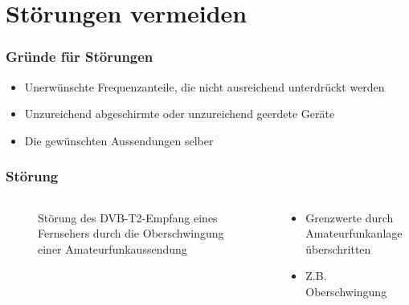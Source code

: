 
\section{Störungen vermeiden}
\label{section:stoerungen_vermeiden}
\begin{frame}%

\frametitle{Gründe für Störungen}
\begin{itemize}
  \item Unerwünschte Frequenzanteile, die nicht ausreichend unterdrückt werden
  \item Unzureichend abgeschirmte oder unzureichend geerdete Geräte 
  \item Die gewünschten Aussendungen selber
  \end{itemize}
\end{frame}

\begin{frame}
\frametitle{Störung}
\begin{columns}
    \begin{column}{0.48\textwidth}
    
\begin{figure}
    \caption{\scriptsize Störung des DVB-T2-Empfang eines Fernsehers durch die Oberschwingung einer Amateurfunkaussendung}
    \label{stoerungen_vermeiden_oberschwingung}
\end{figure}


    \end{column}
   \begin{column}{0.48\textwidth}
       \begin{itemize}
  \item Grenzwerte durch Amateurfunkanlage überschritten
  \item Z.B. Oberschwingung
  \end{itemize}

   \end{column}
\end{columns}

\end{frame}

